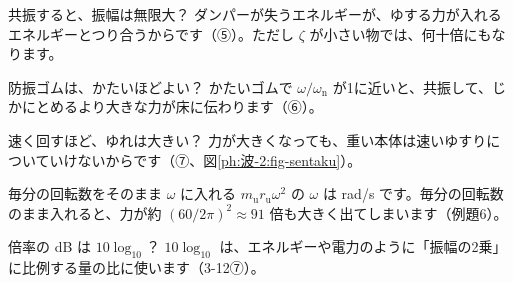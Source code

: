 \begin{tsumazuki}{共振すると、振幅は無限大？}
ダンパーが失うエネルギーが、ゆする力が入れるエネルギーとつり合うからです（⑤）。ただし $\zeta$ が小さい物では、何十倍にもなります。
\end{tsumazuki}

\begin{tsumazuki}{防振ゴムは、かたいほどよい？}
かたいゴムで $\omega/\omega_{\mathrm n}$ が1に近いと、共振して、じかにとめるより大きな力が床に伝わります（⑥）。
\end{tsumazuki}

\begin{tsumazuki}{速く回すほど、ゆれは大きい？}
力が大きくなっても、重い本体は速いゆすりについていけないからです（⑦、図\ref{ph:波-2:fig-sentaku}）。
\end{tsumazuki}

\begin{tsumazuki}{毎分の回転数をそのまま $\omega$ に入れる}
$m_{\mathrm u}r_{\mathrm u}\omega^2$ の $\omega$ は rad/s です。毎分の回転数のまま入れると、力が約 $(60/2\pi)^2\approx91$ 倍も大きく出てしまいます（例題6）。
\end{tsumazuki}

\begin{tsumazuki}{倍率の dB は $10\log_{10}$？}
$10\log_{10}$ は、エネルギーや電力のように「振幅の2乗」に比例する量の比に使います（3-12⑦）。
\end{tsumazuki}

